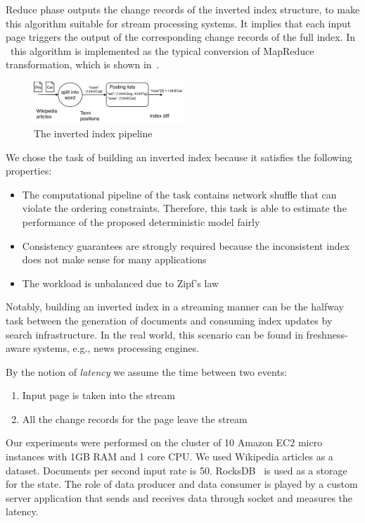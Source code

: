 Reduce phase outputs the change records of the inverted index structure, to make this algorithm suitable for stream processing systems. It implies that each input page triggers the output of the corresponding change records of the full index. In \FlameStream\ this algorithm is implemented as the typical conversion of MapReduce transformation, which is shown in~\cite{hiddenSeim}.

\begin{figure}[htbp]
  \centering
  \includegraphics[width=0.50\textwidth]{pics/index}
  \caption{The inverted index pipeline}
  \label {index}
\end{figure}

We chose the task of building an inverted index because it satisfies the following properties:

\begin{itemize}
    \item The computational pipeline of the task contains network shuffle that can violate the ordering constraints. Therefore, this task is able to estimate the performance of the proposed deterministic model fairly
    \item Consistency guarantees are strongly required because the inconsistent index does not make sense for many applications
    \item The workload is unbalanced due to Zipf's law
\end{itemize}

Notably, building an inverted index in a streaming manner can be the halfway task between the generation of documents and consuming index updates by search infrastructure. In the real world, this scenario can be found in freshness-aware systems, e.g., news processing engines.

By the notion of {\it latency} we assume the time between two events: 

\begin{enumerate}
    \item Input page is taken into the stream
    \item All the change records for the page leave the stream
\end{enumerate}

Our experiments were performed on the cluster of 10 Amazon EC2 micro instances with 1GB RAM and 1 core CPU. We used Wikipedia articles as a dataset. Documents per second input rate is 50. RocksDB~\cite{rocksdb} is used as a storage for the state. The role of data producer and data consumer is played by a custom server application that sends and receives data through socket and measures the latency.

